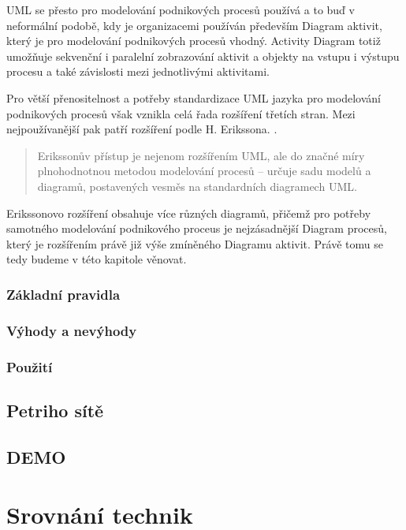 \documentclass[]{article}
\begin{document}
UML se přesto pro modelování podnikových procesů používá a to buď v neformální podobě, kdy je organizacemi používán především Diagram aktivit, který je pro modelování podnikových procesů vhodný. Activity Diagram totiž umožňuje sekvenční i paralelní zobrazování aktivit a objekty na vstupu i výstupu procesu a také závislosti mezi jednotlivými aktivitami.

Pro větší přenositelnost a potřeby standardizace UML jazyka pro modelování podnikových procesů však vznikla celá řada rozšíření třetích stran. Mezi nejpoužívanější pak patří rozšíření podle H. Erikssona. \cite{Repa2007,Eriksson2000}. 

\begin{quote}
Erikssonův přístup je nejenom rozšířením UML, ale do značné míry plnohodnotnou metodou modelování procesů – určuje sadu modelů a diagramů, postavených vesměs na standardních diagramech UML. \cite{Repa2007}
\end{quote}

Erikssonovo rozšíření obsahuje více různých diagramů, přičemž pro potřeby samotného modelování podnikového proceus je nejzásadnější Diagram procesů, který je rozšířením právě již výše zmíněného Diagramu aktivit. Právě tomu se tedy budeme v této kapitole věnovat.

\subsubsection{Základní pravidla}


\subsubsection{Výhody a nevýhody}
\subsubsection{Použití}

\subsection{Petriho sítě}
\subsection{DEMO}
\section{Srovnání technik}

\nocite{*}


\end{document}
